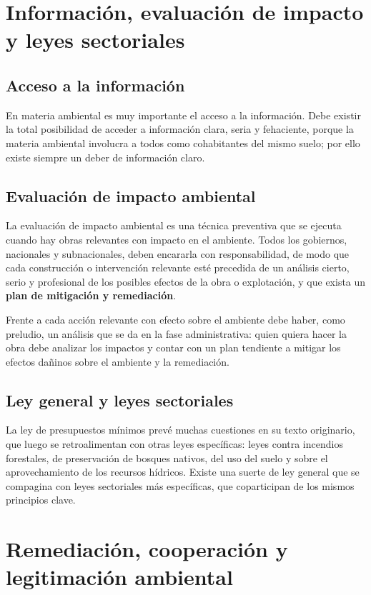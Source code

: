 \documentclass[12pt,oneside]{book}
\begin{document}
\section{Información, evaluación de impacto y leyes sectoriales}

\subsection{Acceso a la información}

En materia ambiental es muy importante el acceso a la información. Debe existir la total posibilidad de acceder a información clara, seria y fehaciente, porque la materia ambiental involucra a todos como cohabitantes del mismo suelo; por ello existe siempre un deber de información claro.

\subsection{Evaluación de impacto ambiental}

La evaluación de impacto ambiental es una técnica preventiva que se ejecuta cuando hay obras relevantes con impacto en el ambiente. Todos los gobiernos, nacionales y subnacionales, deben encararla con responsabilidad, de modo que cada construcción o intervención relevante esté precedida de un análisis cierto, serio y profesional de los posibles efectos de la obra o explotación, y que exista un \textbf{plan de mitigación y remediación}.

Frente a cada acción relevante con efecto sobre el ambiente debe haber, como preludio, un análisis que se da en la fase administrativa: quien quiera hacer la obra debe analizar los impactos y contar con un plan tendiente a mitigar los efectos dañinos sobre el ambiente y la remediación.

\subsection{Ley general y leyes sectoriales}

La ley de presupuestos mínimos prevé muchas cuestiones en su texto originario, que luego se retroalimentan con otras leyes específicas: leyes contra incendios forestales, de preservación de bosques nativos, del uso del suelo y sobre el aprovechamiento de los recursos hídricos. Existe una suerte de ley general que se compagina con leyes sectoriales más específicas, que coparticipan de los mismos principios clave.

\section{Remediación, cooperación y legitimación ambiental}
\end{document}
